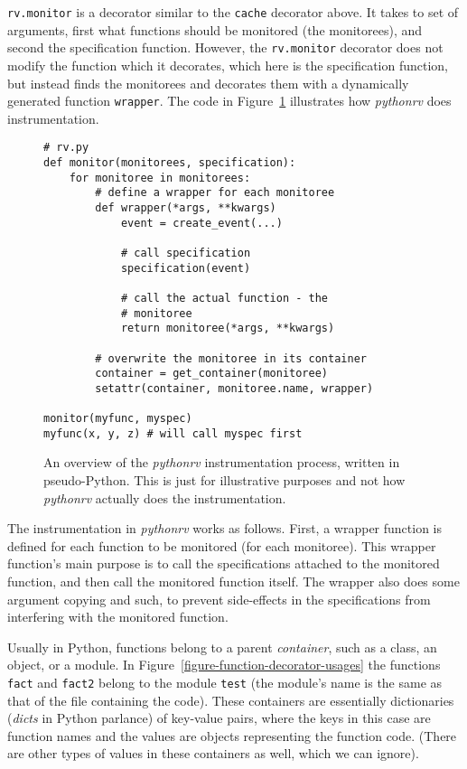 \documentclass[a4paper,11pt]{kth-mag}
\theoremstyle{definition}
\begin{document}
\texttt{rv.monitor} is a decorator similar to the \texttt{cache} decorator
above. It takes to set of arguments, first what functions should be monitored
(the monitorees), and second the specification function. However, the
\texttt{rv.monitor} decorator does not modify the function which it decorates,
which here is the specification function, but instead finds the monitorees and
decorates them with a dynamically generated function \texttt{wrapper}. The code
in Figure~\ref{figure-instrumentation-overview} illustrates how
\textit{pythonrv} does instrumentation.

\begin{figure}[h!]
	\begin{center}
	\begin{minipage}{0.7\textwidth}
	\begin{lstlisting}
# rv.py
def monitor(monitorees, specification):
	for monitoree in monitorees:
		# define a wrapper for each monitoree
		def wrapper(*args, **kwargs)
			event = create_event(...)

			# call specification
			specification(event)

			# call the actual function - the
			# monitoree
			return monitoree(*args, **kwargs)

		# overwrite the monitoree in its container
		container = get_container(monitoree)
		setattr(container, monitoree.name, wrapper)

monitor(myfunc, myspec)
myfunc(x, y, z) # will call myspec first
	\end{lstlisting}
	\end{minipage}
	\end{center}

	\caption{An overview of the \textit{pythonrv} instrumentation process,
		written in pseudo-Python. This is just for illustrative purposes and not
		how \textit{pythonrv} actually does the instrumentation.}
	\label{figure-instrumentation-overview}
\end{figure}

The instrumentation in \textit{pythonrv} works as follows. First, a wrapper
function is defined for each function to be monitored (for each monitoree).
This wrapper function's main purpose is to call the specifications attached to
the monitored function, and then call the monitored function itself. The
wrapper also does some argument copying and such, to prevent side-effects in
the specifications from interfering with the monitored function.

Usually in Python, functions belong to a parent \textit{container}, such as a
class, an object, or a module\footnotemark. In
Figure~\ref{figure-function-decorator-usages} the functions \texttt{fact} and
\texttt{fact2} belong to the module \texttt{test} (the module's name is the
same as that of the file containing the code). These containers are essentially
dictionaries (\textit{dicts} in Python parlance) of key-value pairs, where the
keys in this case are function names and the values are objects representing
the function code. (There are other types of values in these containers as
well, which we can ignore).
\end{document}
